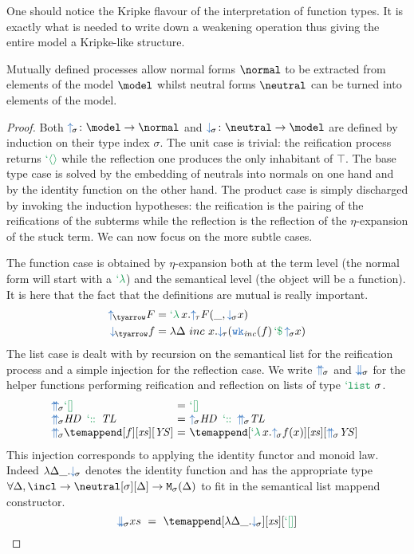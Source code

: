 \begin{remark}One should notice the Kripke flavour of the interpretation of
function types. It is exactly what is needed to write down a weakening operation
thus giving the entire model a Kripke-like structure.
\end{remark}
\begin{lemma} Mutually defined processes allow normal forms
$\normal$ to be extracted from elements of the model $\model$ whilst neutral
forms $\neutral$ can be turned into elements of the model.
\end{lemma}
\begin{proof} Both $\reify \colon \model \rightarrow \normal$ and $\reflect \colon
\neutral \rightarrow \model$ are defined by induction on their type index $\sigma$.
The unit case is trivial: the reification process returns $\tett$ while the
reflection one produces the only inhabitant of $\top$. The base type case is
solved by the embedding of neutrals into normals on one hand and by the identity
function on the other hand. The product case is simply discharged by invoking
the induction hypotheses: the reification is the pairing of the reifications of
the subterms while the reflection is the reflection of the $\eta$-expansion of
the stuck term. We can now focus on the more subtle cases.

The function case is obtained by $\eta$-expansion both at the term level (the
normal form will start with a $\telam$) and the semantical level (the object
will be a function). It is here that the fact that the definitions are mutual
is really important.
\begin{align*}
\reify[\tyarrow] F &= \telam x. \reify[\tau] F (\_, \reflect x) \\
\reflect[\tyarrow] f &= \lambda \Delta~inc~x.\reflect[\tau](\weaken(f) \teapp \reify[\sigma] x)
\end{align*}
The list case is dealt with by recursion on the semantical list for the reification
process and a simple injection for the reflection case. We write $\listreify$ and
$\listreflect$ for the helper functions performing reification and reflection on
lists of type $\tylist$.
$$\begin{array}{@{\listreify}l@{~=~}l}
\tenil                                  & \tenil \\
\mathit{HD} \tecons \mathit{TL}         & \reify \mathit{HD} \tecons \listreify \mathit{TL} \\
\temappend[f][\mathit{xs}][\mathit{YS}] & \temappend[\telam x.\reify f(x)][\mathit{xs}][\listreify \mathit{YS}]
\end{array}$$
This injection corresponds to applying the identity functor and monoid law. Indeed
$\lambda \Delta \_. \reflect$ denotes the identity function and has the appropriate
type $\forall \Delta, \incl \rightarrow \neutral[\sigma][\Delta] \rightarrow \modellistfunabs(\Delta)$
to fit in the semantical list mappend constructor.
$$\listreflect xs ~=~ \temappend[\lambda \Delta \_. \reflect][\mathit{xs}][\tenil]$$
\end{proof}

